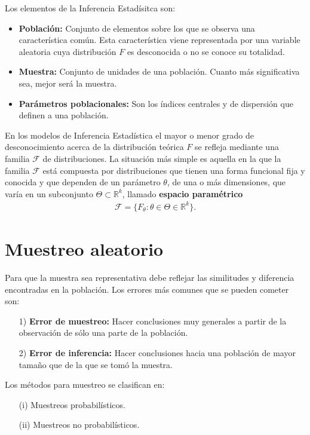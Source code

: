 Los elementos de la Inferencia Estadísitca son:
\begin{itemize}
    \item \textbf{Población:} Conjunto de elementos sobre los que se observa una característica común. Esta característica viene representada por una variable aleatoria cuya distribución $F$ es desconocida o no se conoce su totalidad.
    \item \textbf{Muestra:} Conjunto de unidades de una población. Cuanto más significativa sea, mejor será la muestra.
    \item \textbf{Parámetros poblacionales:} Son los índices centrales y de dispersión que definen a una población.
\end{itemize}
En los modelos de Inferencia Estadística el mayor o menor grado de desconocimiento acerca de la distribución teórica $F$ se refleja mediante una familia $\mathcal{F}$ de distribuciones. La situación más simple es aquella en la que la familia $\mathcal{F}$ está compuesta por distribuciones que tienen una forma funcional fija y conocida y que dependen de un parámetro $\theta$, de una o más dimensiones, que varía en un subconjunto $\Theta \subset \mathbb{R}^k$, llamado \textbf{espacio paramétrico}
\begin{align*}
    \mathcal{F} = \{ F_{\theta} : \theta \in \Theta \in \mathbb{R}^k \}.
\end{align*}

\section{Muestreo aleatorio}
Para que la muestra sea representativa debe reflejar las similitudes y diferencia encontradas en la población. Los errores más comunes que se pueden cometer son:
\begin{enumerate}
    \item[1)] \textbf{Error de muestreo:} Hacer conclusiones muy generales a partir de la observación de sólo una parte de la población.
    \item[2)] \textbf{Error de inferencia:} Hacer conclusiones hacia una población de mayor tamaño que de la que se tomó la muestra.
\end{enumerate}
Los métodos para muestreo se clasifican en:
\begin{enumerate}
    \item[(i)] Muestreos probabilísticos.
    \item[(ii)] Muestreos no probabilísticos.
\end{enumerate}

